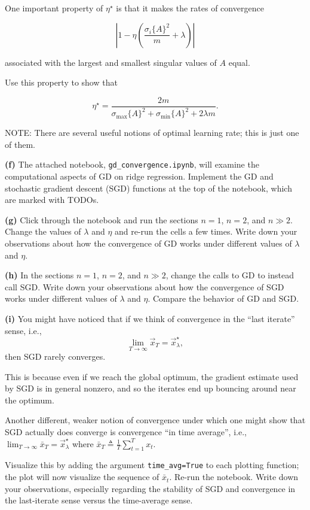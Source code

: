 \documentclass[
  12pt,
]{fphw}
\begin{document}
One important property of $\eta^\star$ is that it makes the rates of convergence

\[ \left| 1-\eta \left( \frac{\sigma_i\{A\}^2}{m}+\lambda \right) \right| \]

associated with the largest and smallest singular values of $A$ equal.

Use this property to show that

\[
\eta^\star
=
\frac{2m}
{\sigma_{\max}\{A\}^2
+
\sigma_{\min}\{A\}^2
+
2\lambda m}.
\tag{11}
\]

NOTE: There are several useful notions of optimal learning rate; this is just one of them.

\textbf{(f)}
The attached notebook, \texttt{gd\_convergence.ipynb}, will examine the computational aspects of GD on ridge regression. Implement the GD and stochastic gradient descent (SGD) functions at the top of the notebook, which are marked with TODOs.

\textbf{(g)}
Click through the notebook and run the sections $n=1$, $n=2$, and $n\gg2$. Change the values of $\lambda$ and $\eta$ and re-run the cells a few times. Write down your observations about how the convergence of GD works under different values of $\lambda$ and $\eta$.

\textbf{(h)}
In the sections $n=1$, $n=2$, and $n\gg2$, change the calls to GD to instead call SGD. Write down your observations about how the convergence of SGD works under different values of $\lambda$ and $\eta$. Compare the behavior of GD and SGD.

\textbf{(i)}
You might have noticed that if we think of convergence in the “last iterate” sense, i.e.,
\[
\lim_{T\to\infty} \vec{x}_T = \vec{x}_\lambda^\star,
\]
then SGD rarely converges.

This is because even if we reach the global optimum, the gradient estimate used by SGD is in general nonzero, and so the iterates end up bouncing around near the optimum.

Another different, weaker notion of convergence under which one might show that SGD actually does converge is convergence “in time average”, i.e.,
$
\lim_{T\to\infty} \bar{x}_T = \vec{x}_\lambda^\star
$
where
$ \bar{x}_T \triangleq \frac1T \sum_{t=1}^T x_t. $

Visualize this by adding the argument \texttt{time\_avg=True} to each plotting function; the plot will now visualize the sequence of $\bar{x}_t$. Re-run the notebook. Write down your observations, especially regarding the stability of SGD and convergence in the last-iterate sense versus the time-average sense.
\end{document}
